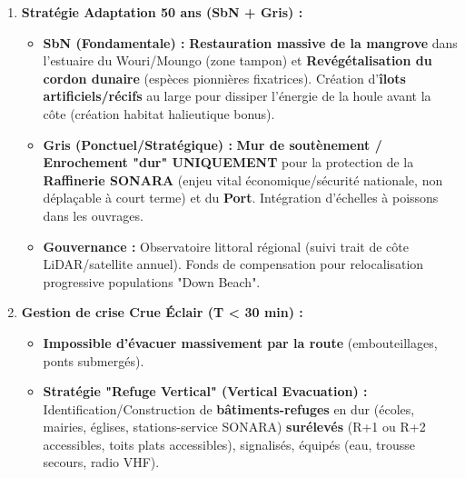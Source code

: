 \documentclass[11pt]{article}
\begin{document}
\begin{exoresolu}
\begin{enumerate}
\begin{itemize}
\begin{itemize}
                      \item \textbf{Jaune :} Pluie > 50mm/3h OU Houle > 3m + Coeff marée > 90. Info population.
                      \item \textbf{Orange :} Pluie > 80mm/3h OU Niveau rivière > Côte alerte + Houle > 4m. Pré-positionnement secours, alerte SONARA/Port.
                      \item \textbf{Rouge :} Pluie > 100mm/3h OU Rupture digue imminente OU Submersion en cours. \textbf{ÉVACUATION IMMÉDIATE} zones basses.
                  \end{itemize}
              \item \textbf{Diffusion :} Sirènes (quartiers denses), SMS Cell Broadcast (tous opérateurs), Radio locale (Ocean City Radio, CBS), Relais chefs de quartiers/blocs (tradition orale), WhatsApp groupes leaders jeunesse/femmes. \textbf{Langues :} Français, Pidgin, Bakweri.
          \end{itemize}
    \item \textbf{Stratégie Adaptation 50 ans (SbN + Gris) :}
          \begin{itemize}
              \item \textbf{SbN (Fondamentale) :} \textbf{Restauration massive de la mangrove} dans l'estuaire du Wouri/Moungo (zone tampon) et \textbf{Revégétalisation du cordon dunaire} (espèces pionnières fixatrices). Création d'\textbf{îlots artificiels/récifs} au large pour dissiper l'énergie de la houle avant la côte (création habitat halieutique bonus).
              \item \textbf{Gris (Ponctuel/Stratégique) :} \textbf{Mur de soutènement / Enrochement "dur" UNIQUEMENT} pour la protection de la \textbf{Raffinerie SONARA} (enjeu vital économique/sécurité nationale, non déplaçable à court terme) et du \textbf{Port}. Intégration d'échelles à poissons dans les ouvrages.
              \item \textbf{Gouvernance :} Observatoire littoral régional (suivi trait de côte LiDAR/satellite annuel). Fonds de compensation pour relocalisation progressive populations "Down Beach".
          \end{itemize}
    \item \textbf{Gestion de crise Crue Éclair (T < 30 min) :}
          \begin{itemize}
              \item \textbf{Impossible d'évacuer massivement par la route} (embouteillages, ponts submergés).
              \item \textbf{Stratégie "Refuge Vertical" (Vertical Evacuation) :} Identification/Construction de \textbf{bâtiments-refuges} en dur (écoles, mairies, églises, stations-service SONARA) \textbf{surélevés} (R+1 ou R+2 accessibles, toits plats accessibles), signalisés, équipés (eau, trousse secours, radio VHF).

\end{itemize}
\end{enumerate}
\end{exoresolu}
\end{document}

